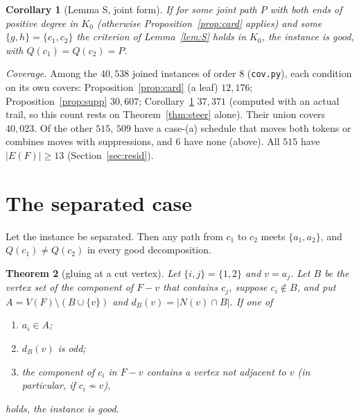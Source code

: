 \documentclass[11pt]{amsart}
\newtheorem{theorem}{Theorem}[section]
\newtheorem{corollary}[theorem]{Corollary}
\theoremstyle{definition}
\begin{document}
\begin{corollary}[Lemma S, joint form]\label{cor:S}
If for some joint path $P$ with both ends of positive degree in $K_0$ (otherwise
Proposition~\ref{prop:card} applies) and some $\{g,h\}=\{c_1,c_2\}$ the criterion of
Lemma~\ref{lem:S} holds in $K_0$, the instance is good, with $Q(c_1)=Q(c_2)=P$.
\end{corollary}

\emph{Coverage.} Among the $40{,}538$ joined instances of order $8$ (\texttt{cov.py}), each condition on its own
covers: Proposition~\ref{prop:card} (a leaf) $12{,}176$; Proposition~\ref{prop:supp} $30{,}607$;
Corollary~\ref{cor:S} $37{,}371$ (computed with an actual trail, so this count rests on
Theorem~\ref{thm:steer} alone). Their union covers $40{,}023$. Of the other $515$, $509$ have a case-(a)
schedule that moves both tokens or combines moves with suppressions, and $6$ have none (above). All $515$ have $|E(F)|\ge13$
(Section~\ref{sec:resid}).

\section{The separated case}\label{sec:sep}

Let the instance be separated. Then any path from $c_1$ to $c_2$ meets $\{a_1,a_2\}$, and
$Q(c_1)\ne Q(c_2)$ in every good decomposition.

\begin{theorem}[gluing at a cut vertex]\label{thm:G}
Let $\{i,j\}=\{1,2\}$ and $v=a_j$. Let $B$ be the vertex set of the component of $F-v$ that contains
$c_j$, suppose $c_i\notin B$, and put $A=V(F)\setminus(B\cup\{v\})$ and $d_B(v)=|N(v)\cap B|$. If one
of
\begin{enumerate}[label=(G\arabic*)]
\item $a_i\in A$;
\item $d_B(v)$ is odd;
\item the component of $c_i$ in $F-v$ contains a vertex not adjacent to $v$ (in particular, if
$c_i\not\sim v$),
\end{enumerate}
holds, the instance is good.
\end{theorem}
\end{document}
